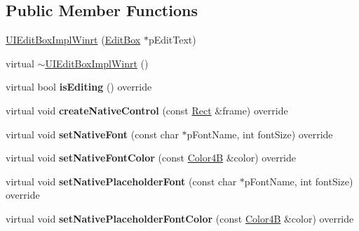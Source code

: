\subsection*{Public Member Functions}
\begin{DoxyCompactItemize}
\item 
\hyperlink{classui_1_1UIEditBoxImplWinrt_a30e610086632e20321d082978836cd90}{U\+I\+Edit\+Box\+Impl\+Winrt} (\hyperlink{classui_1_1EditBox}{Edit\+Box} $\ast$p\+Edit\+Text)
\item 
virtual \hyperlink{classui_1_1UIEditBoxImplWinrt_afa4a487089107a6f4cf5f5e0ffe8dd3b}{$\sim$\+U\+I\+Edit\+Box\+Impl\+Winrt} ()
\item 
\mbox{\label{classui_1_1UIEditBoxImplWinrt_afcaec5e71dbd84cd7302280bb8ffe54a}} 
virtual bool {\bfseries is\+Editing} () override
\item 
\mbox{\label{classui_1_1UIEditBoxImplWinrt_a5438a1e91955a8d58fd9f2327320082d}} 
virtual void {\bfseries create\+Native\+Control} (const \hyperlink{classRect}{Rect} \&frame) override
\item 
\mbox{\label{classui_1_1UIEditBoxImplWinrt_a86d46b38d200ff2d1baf106972e80c9a}} 
virtual void {\bfseries set\+Native\+Font} (const char $\ast$p\+Font\+Name, int font\+Size) override
\item 
\mbox{\label{classui_1_1UIEditBoxImplWinrt_ad6c5074291ea66535ff01558fdc11312}} 
virtual void {\bfseries set\+Native\+Font\+Color} (const \hyperlink{structColor4B}{Color4B} \&color) override
\item 
\mbox{\label{classui_1_1UIEditBoxImplWinrt_a3c62f197559bc59eb61e9931adcdc06e}} 
virtual void {\bfseries set\+Native\+Placeholder\+Font} (const char $\ast$p\+Font\+Name, int font\+Size) override
\item 
\mbox{\label{classui_1_1UIEditBoxImplWinrt_a7839bc43b2d46924fbae47439ce12990}} 
virtual void {\bfseries set\+Native\+Placeholder\+Font\+Color} (const \hyperlink{structColor4B}{Color4B} \&color) override
\item 
\mbox{\label{classui_1_1UIEditBoxImplWinrt_a3f70f31a9d551850befb95df4519a7b9}} 

\end{DoxyCompactItemize}
